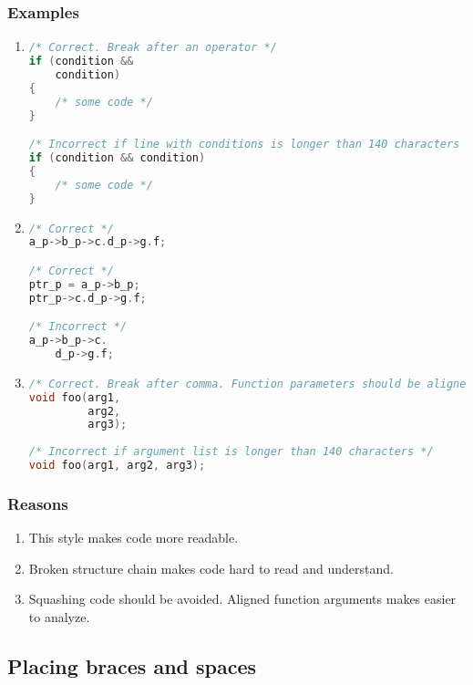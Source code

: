 \subsubsection{Examples}
\begin{enumerate}
    \item 
\begin{lstlisting}[language=C,style=C99]
/* Correct. Break after an operator */
if (condition &&
    condition)
{
    /* some code */
}

/* Incorrect if line with conditions is longer than 140 characters */
if (condition && condition)
{
    /* some code */
}
\end{lstlisting}    

    \item 
\begin{lstlisting}[language=C,style=C99]
/* Correct */
a_p->b_p->c.d_p->g.f;

/* Correct */
ptr_p = a_p->b_p;
ptr_p->c.d_p->g.f;

/* Incorrect */
a_p->b_p->c.
    d_p->g.f;
\end{lstlisting} 

    \item 
\begin{lstlisting}[language=C,style=C99]
/* Correct. Break after comma. Function parameters should be aligned */
void foo(arg1,
         arg2,
         arg3);
         
/* Incorrect if argument list is longer than 140 characters */
void foo(arg1, arg2, arg3);
\end{lstlisting}  
\end{enumerate}

\subsubsection{Reasons}
\begin{enumerate}
    \item This style makes code more readable.
    \item Broken structure chain makes code hard to read and understand.
    \item Squashing code should be avoided. Aligned function arguments makes easier to analyze.
\end{enumerate}

\subsection{Placing braces and spaces}
